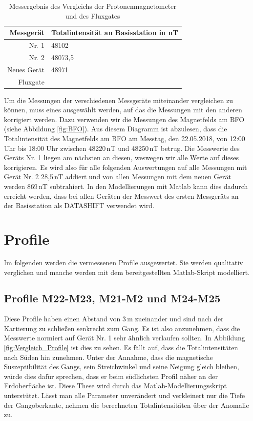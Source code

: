 \begin{table}[!ht]
 \centering
 \caption{Messergebnis des Vergleichs der Protonenmagnetometer und des Fluxgates}
 \begin{tabular}{rl}
 \toprule
 Messgerät & Totalintensität an Basisstation in nT \\
 \midrule
 Nr. 1 & 48102 \\
 Nr. 2 & 48073,5 \\
 Neues Gerät & 48971 \\
 Fluxgate &  \\
 \bottomrule
 \end{tabular}
\label{tab:VergleichErgebnis}
\end{table}

Um die Messungen der verschiedenen Messgeräte miteinander vergleichen zu können, muss eines ausgewählt werden, auf das die Messungen mit den anderen korrigiert werden. Dazu verwenden wir die Messungen des Magnetfelds am BFO (siehe Abbildung \ref{fig:BFO}). Aus diesem Diagramm ist abzulesen, dass die Totalintensität des Magnetfelds am BFO am Messtag, den 22.05.2018, von 12:00 Uhr bis 18:00 Uhr zwischen 48220\,nT und 48250\,nT betrug. Die Messwerte des Geräts Nr. 1 liegen am nächsten an diesen, weswegen wir alle Werte auf dieses korrigieren. Es wird also für alle folgenden Auswertungen auf alle Messungen mit Gerät Nr. 2  28,5\,nT addiert und von allen Messungen mit dem neuen Gerät werden 869\,nT subtrahiert. In den Modellierungen mit Matlab kann dies dadurch erreicht werden, dass bei allen Geräten der Messwert des ersten Messgeräts an der Basisstation als DATASHIFT verwendet wird.

\section{Profile}

Im folgenden werden die vermessenen Profile ausgewertet. Sie werden qualitativ verglichen und manche werden mit dem bereitgestellten Matlab-Skript modelliert.

\subsection{Profile M22-M23, M21-M2 und M24-M25}

Diese Profile haben einen Abstand von 3\,m zueinander und sind nach der Kartierung zu schließen senkrecht zum Gang. Es ist also anzunehmen, dass die Messwerte normiert auf Gerät Nr. 1 sehr ähnlich verlaufen sollten. In Abbildung \ref{fig:Vergleich_Profile} ist dies zu sehen. Es fällt auf, dass die Totalintensitäten nach Süden hin zunehmen. Unter der Annahme, dass die magnetische Suszeptibilität des Gangs, sein Streichwinkel und seine Neigung gleich bleiben, würde dies dafür sprechen, dass er beim südlichsten Profil näher an der Erdoberfläche ist. Diese These wird durch das Matlab-Modellierungsskript unterstützt. Lässt man alle Parameter unverändert und verkleinert nur die Tiefe der Gangoberkante, nehmen die berechneten Totalintensitäten über der Anomalie zu.

